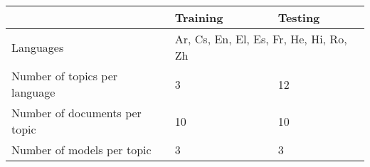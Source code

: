 \begin{tabular}{p{}p{}p{}} 
\hline \hline

 & Training & Testing \\

\hline
Languages 	& \multicolumn{2}{p{.4\textwidth}}{Ar, Cs, En, El, Es, Fr, He, Hi, Ro, Zh} \\
Number of topics per language & 3  &  12\\
Number of documents per topic & 10  & 10  \\
Number of models per topic & 3 & 3 \\

\hline \hline
\end{tabular}
